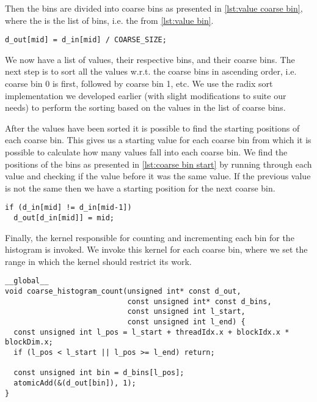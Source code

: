 Then the bins are divided into coarse bins as presented in \cref{lst:value coarse bin}, where the  is the list of bins, i.e. the  from \cref{lst:value bin}.

\begin{lstlisting}[caption={compute each value's coarse bin}, label={lst:value coarse bin}, numbers=none]
d_out[mid] = d_in[mid] / COARSE_SIZE;
\end{lstlisting}

We now have a list of values, their respective bins, and their coarse bins.
The next step is to sort all the values w.r.t. the coarse bins in ascending order, i.e. coarse bin 0 is first, followed by coarse bin 1, etc.
We use the radix sort implementation we developed earlier (with slight modifications to suite our needs) to perform the sorting based on the values in the list of coarse bins.

After the values have been sorted it is possible to find the starting positions of each coarse bin.
This gives us a starting value for each coarse bin from which it is possible to calculate how many values fall into each coarse bin.
We find the positions of the bins as presented in \cref{lst:coarse bin start} by running through each value and checking if the value before it was the same value.
If the previous value is not the same then we have a starting position for the next coarse bin.

\begin{lstlisting}[caption={find the start positions of each coarse bin}, label={lst:coarse bin start}, numbers=none]
if (d_in[mid] != d_in[mid-1])
  d_out[d_in[mid]] = mid;
\end{lstlisting}

Finally, the kernel responsible for counting and incrementing each bin for the histogram is invoked.
We invoke this kernel for each coarse bin, where we set the range in which the kernel should restrict its work.

\begin{lstlisting}[caption={kernel to do histogram count for each coarse bin}, label={lst:coarse histo kernel}]
__global__
void coarse_histogram_count(unsigned int* const d_out,
                            const unsigned int* const d_bins,
                            const unsigned int l_start,
                            const unsigned int l_end) {
  const unsigned int l_pos = l_start + threadIdx.x + blockIdx.x * blockDim.x;
  if (l_pos < l_start || l_pos >= l_end) return;

  const unsigned int bin = d_bins[l_pos];
  atomicAdd(&(d_out[bin]), 1);
}
\end{lstlisting}

